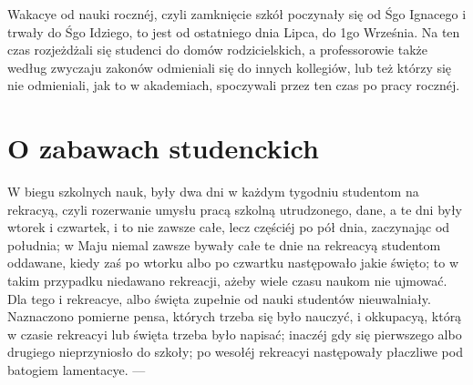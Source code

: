 \documentclass{book}
\begin{document}
Wakacye od nauki rocznéj, czyli zamknięcie szkół poczynały się od Śgo Ignacego i trwały do Śgo Idziego, to jest od ostatniego dnia Lipca, do 1go Września. Na ten czas rozjeżdżali się studenci do domów rodzicielskich, a professorowie także według zwyczaju zakonów odmieniali się do innych kollegiów, lub też którzy się nie odmieniali, jak to w akademiach, spoczywali przez ten czas po pracy rocznéj.

\section{O zabawach studenckich}

W biegu szkolnych nauk, były dwa dni w każdym tygodniu studentom na rekracyą, czyli rozerwanie umysłu pracą szkolną utrudzonego, dane, a te dni były wtorek i czwartek, i to nie zawsze całe, lecz częściéj po pół dnia, zaczynając od południa; w Maju niemal zawsze bywały całe te dnie na rekreacyą studentom oddawane, kiedy zaś po wtorku albo po czwartku następowało jakie święto; to w takim przypadku niedawano rekreacji, ażeby wiele czasu naukom nie ujmować. Dla tego i rekreacye, albo święta zupełnie od nauki studentów nieuwalniały. Naznaczono pomierne pensa, których trzeba się było nauczyć, i okkupacyą, którą w czasie rekreacyi lub święta trzeba było napisać; inaczéj gdy się pierwszego albo drugiego nieprzyniosło do szkoły; po wesołéj rekreacyi następowały płaczliwe pod batogiem lamentacye. —
\end{document}
